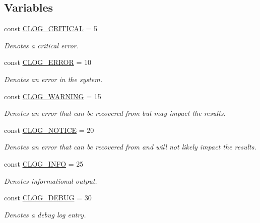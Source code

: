 \subsection*{Variables}
\begin{DoxyCompactItemize}
\item 
const \hyperlink{group__log__levels_ga9e72f6a54bb75da33d3d8a8409cb9653}{C\-L\-O\-G\-\_\-\-C\-R\-I\-T\-I\-C\-A\-L} = 5
\begin{DoxyCompactList}\small\item\em Denotes a critical error. \end{DoxyCompactList}\item 
const \hyperlink{group__log__levels_gacd8b449d24550e76fa0b9682e816da94}{C\-L\-O\-G\-\_\-\-E\-R\-R\-O\-R} = 10
\begin{DoxyCompactList}\small\item\em Denotes an error in the system. \end{DoxyCompactList}\item 
const \hyperlink{group__log__levels_ga68940804f97ceabbba29e52e2caf22b9}{C\-L\-O\-G\-\_\-\-W\-A\-R\-N\-I\-N\-G} = 15
\begin{DoxyCompactList}\small\item\em Denotes an error that can be recovered from but may impact the results. \end{DoxyCompactList}\item 
const \hyperlink{group__log__levels_ga8fe5fb4d67cefbcc5556321a2a1ffaec}{C\-L\-O\-G\-\_\-\-N\-O\-T\-I\-C\-E} = 20
\begin{DoxyCompactList}\small\item\em Denotes an error that can be recovered from and will not likely impact the results. \end{DoxyCompactList}\item 
const \hyperlink{group__log__levels_gac0257446453fba0e349b1334d3a6c206}{C\-L\-O\-G\-\_\-\-I\-N\-F\-O} = 25
\begin{DoxyCompactList}\small\item\em Denotes informational output. \end{DoxyCompactList}\item 
const \hyperlink{group__log__levels_ga7a20d07461d8da70f7ddccd254222419}{C\-L\-O\-G\-\_\-\-D\-E\-B\-U\-G} = 30
\begin{DoxyCompactList}\small\item\em Denotes a debug log entry. \end{DoxyCompactList}\end{DoxyCompactItemize}
